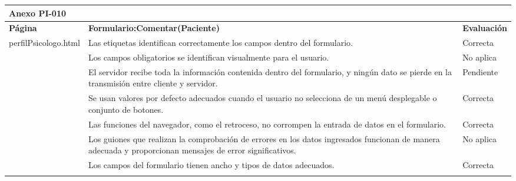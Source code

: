 \clearpage

\begin{table}[htpb]
\centering
\begin{tabularx}{\textwidth}{|l|X|l|}
\hline
\multicolumn{3}{|l|}{\textbf{Anexo PI-010}}                                                                                                                                                                               \\ \hline
\textbf{Página}                        & \textbf{Formulario:Comentar(Paciente)}                                                                                                                    & \textbf{Evaluación} \\ \hline
\multirow{10}{*}{perfilPsicologo.html} & Las etiquetas identifican correctamente los campos dentro del formulario.                                                                                 & Correcta            \\ \cline{2-3} 
                                       & Los campos obligatorios se identifican visualmente para el usuario.                                                                                       & No aplica           \\ \cline{2-3} 
                                       & El servidor recibe toda la información contenida dentro del formulario, y ningún dato se pierde en la transmisión entre cliente y servidor.               & Pendiente           \\ \cline{2-3} 
                                       & Se usan valores por defecto adecuados cuando el usuario no selecciona de un menú desplegable o conjunto de botones.                                       & Correcta            \\ \cline{2-3} 
                                       & Las funciones del navegador, como el retroceso, no corrompen la entrada de datos en el formulario.                                                        & Correcta            \\ \cline{2-3} 
                                       & Los guiones que realizan la comprobación de errores en los datos ingresados funcionan de manera adecuada y proporcionan mensajes de error significativos. & No aplica           \\ \cline{2-3} 
                                       & Los campos del formulario tienen ancho y tipos de datos adecuados.                                                                                        & Correcta            \\ \cline{2-3} 

\end{tabularx}
\end{table}

